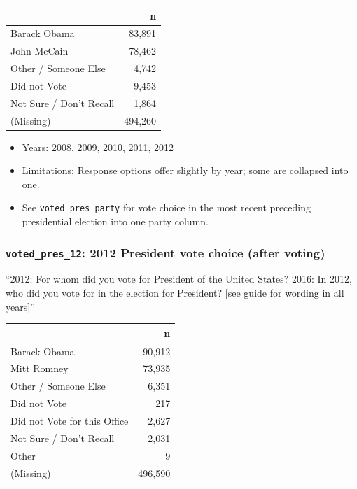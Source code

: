 \documentclass[10pt,article,oneside]{memoir}
\theoremstyle{definition}
\begin{document}
\begin{table}[H]
\centering
\begin{tabular}[t]{lr}
\toprule
 & n\\
\midrule
Barack Obama & 83,891\\
John McCain & 78,462\\
Other / Someone Else & 4,742\\
Did not Vote & 9,453\\
Not Sure / Don't Recall & 1,864\\
(Missing) & 494,260\\
\bottomrule
\end{tabular}
\end{table}

\begin{itemize}
\tightlist
\item
  Years: 2008, 2009, 2010, 2011, 2012
\item
  Limitations: Response options offer slightly by year; some are
  collapsed into one.
\item
  See \texttt{voted\_pres\_party} for vote choice in the most recent
  preceding presidential election into one party column.
\end{itemize}

\subsubsection{\texorpdfstring{\texttt{voted\_pres\_12}: 2012 President
vote choice (after
voting)}{voted\_pres\_12: 2012 President vote choice (after voting)}}\label{voted_pres_12-2012-president-vote-choice-after-voting}

``2012: For whom did you vote for President of the United States? 2016:
In 2012, who did you vote for in the election for President? {[}see
guide for wording in all years{]}''

\begin{table}[H]
\centering
\begin{tabular}[t]{lr}
\toprule
 & n\\
\midrule
Barack Obama & 90,912\\
Mitt Romney & 73,935\\
Other / Someone Else & 6,351\\
Did not Vote & 217\\
Did not Vote for this Office & 2,627\\
Not Sure / Don't Recall & 2,031\\
Other & 9\\
(Missing) & 496,590\\
\bottomrule
\end{tabular}
\end{table}
\end{document}
